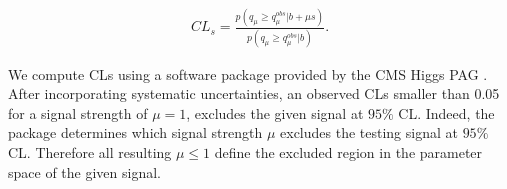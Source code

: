 \begin{align}
CL_s = \frac{p(q_\mu \geq q_\mu^{obs} | b + \mu s )}{p(q_\mu \geq q_\mu^{obs} | b)}.
\end{align}
 
We compute CLs using a software package provided by the CMS Higgs PAG \cite{higgspag:software}.
After incorporating systematic uncertainties, an observed CLs smaller than 0.05 for a signal strength of $\mu = 1$, excludes the given signal at $95\%$ CL. Indeed, the package determines which signal strength $\mu$ excludes the testing signal at $95\%$ CL. Therefore all resulting $\mu \leq 1$ define the excluded region in the parameter space of the given signal. 


